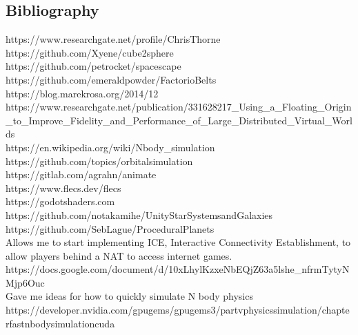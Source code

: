 \documentclass[12pt, DIV=calc]{scrartcl}
\begin{document}
\subsection{Bibliography}


https://www.researchgate.net/profile/Chris\-Thorne \\
https://github.com/Xyene/cube2sphere \\
https://github.com/petrocket/spacescape \\
https://github.com/emeraldpowder/FactorioBelts \\
https://blog.marekrosa.org/2014/12 \\
https://www.researchgate.net/publication/331628217\_Using\_a\_Floating\_Origin\_to\_Improve\_Fidelity\_and\_Performance\_of\_Large\_Distributed\_Virtual\_Worlds \\
https://en.wikipedia.org/wiki/N\-body\_simulation \\
https://github.com/topics/orbital\-simulation \\
https://gitlab.com/agrahn/animate \\
https://www.flecs.dev/flecs \\
https://godotshaders.com \\
https://github.com/notakamihe/Unity\-Star\-Systems\-and\-Galaxies \\
https://github.com/SebLague/Procedural\-Planets \\
Allows me to start implementing ICE, Interactive Connectivity Establishment, to allow players behind a NAT to access internet games. https://docs.google.com/document/d/10xLhy\-lKzxeNbEQjZ63a5lshe\-\_nfrmTytyNMjp6Ouc \\
Gave me ideas for how to quickly simulate N body physics https://developer.nvidia.com/gpugems/gpugems3/part\-v\-physics\-simulation/chapter\-fast\-n\-body\-simulation\-cuda
\end{document}
